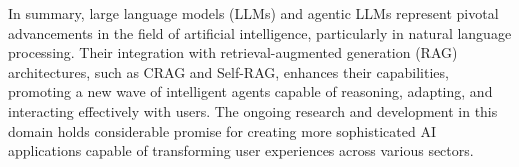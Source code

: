 In summary, large language models (LLMs) and agentic LLMs represent pivotal advancements in the field of artificial intelligence, particularly in natural language processing. Their integration with retrieval-augmented generation (RAG) architectures, such as CRAG and Self-RAG, enhances their capabilities, promoting a new wave of intelligent agents capable of reasoning, adapting, and interacting effectively with users. The ongoing research and development in this domain holds considerable promise for creating more sophisticated AI applications capable of transforming user experiences across various sectors.

 